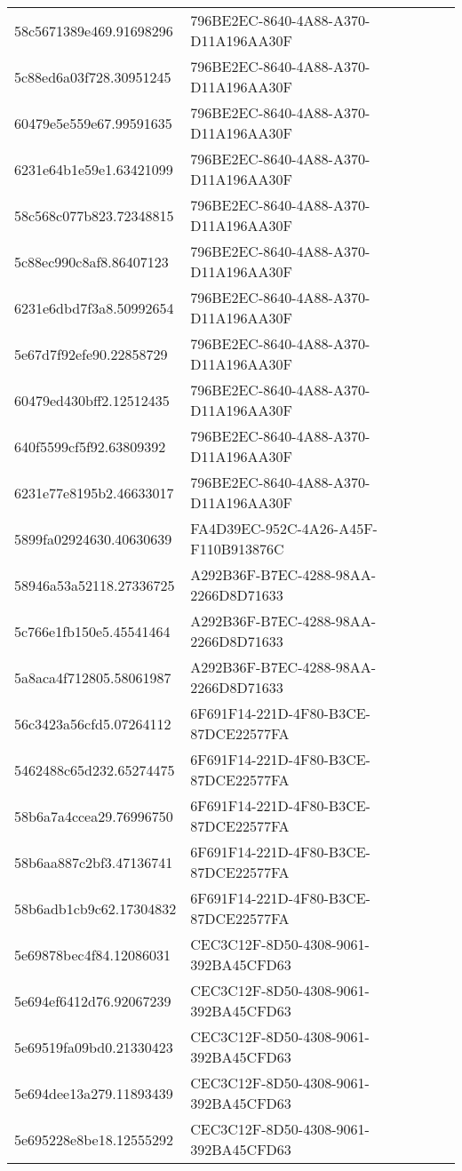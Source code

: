 \begin{tabular}{ll}
58c5671389e469.91698296 & 796BE2EC-8640-4A88-A370-D11A196AA30F \\
5c88ed6a03f728.30951245 & 796BE2EC-8640-4A88-A370-D11A196AA30F \\
60479e5e559e67.99591635 & 796BE2EC-8640-4A88-A370-D11A196AA30F \\
6231e64b1e59e1.63421099 & 796BE2EC-8640-4A88-A370-D11A196AA30F \\
58c568c077b823.72348815 & 796BE2EC-8640-4A88-A370-D11A196AA30F \\
5c88ec990c8af8.86407123 & 796BE2EC-8640-4A88-A370-D11A196AA30F \\
6231e6dbd7f3a8.50992654 & 796BE2EC-8640-4A88-A370-D11A196AA30F \\
5e67d7f92efe90.22858729 & 796BE2EC-8640-4A88-A370-D11A196AA30F \\
60479ed430bff2.12512435 & 796BE2EC-8640-4A88-A370-D11A196AA30F \\
640f5599cf5f92.63809392 & 796BE2EC-8640-4A88-A370-D11A196AA30F \\
6231e77e8195b2.46633017 & 796BE2EC-8640-4A88-A370-D11A196AA30F \\
5899fa02924630.40630639 & FA4D39EC-952C-4A26-A45F-F110B913876C \\
58946a53a52118.27336725 & A292B36F-B7EC-4288-98AA-2266D8D71633 \\
5c766e1fb150e5.45541464 & A292B36F-B7EC-4288-98AA-2266D8D71633 \\
5a8aca4f712805.58061987 & A292B36F-B7EC-4288-98AA-2266D8D71633 \\
56c3423a56cfd5.07264112 & 6F691F14-221D-4F80-B3CE-87DCE22577FA \\
5462488c65d232.65274475 & 6F691F14-221D-4F80-B3CE-87DCE22577FA \\
58b6a7a4ccea29.76996750 & 6F691F14-221D-4F80-B3CE-87DCE22577FA \\
58b6aa887c2bf3.47136741 & 6F691F14-221D-4F80-B3CE-87DCE22577FA \\
58b6adb1cb9c62.17304832 & 6F691F14-221D-4F80-B3CE-87DCE22577FA \\
5e69878bec4f84.12086031 & CEC3C12F-8D50-4308-9061-392BA45CFD63 \\
5e694ef6412d76.92067239 & CEC3C12F-8D50-4308-9061-392BA45CFD63 \\
5e69519fa09bd0.21330423 & CEC3C12F-8D50-4308-9061-392BA45CFD63 \\
5e694dee13a279.11893439 & CEC3C12F-8D50-4308-9061-392BA45CFD63 \\
5e695228e8be18.12555292 & CEC3C12F-8D50-4308-9061-392BA45CFD63 \\

\end{tabular}
